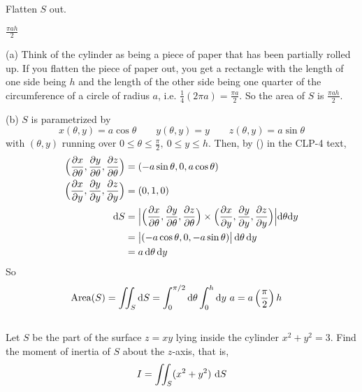 \begin{hint} 
Flatten $S$ out.
\end{hint}

\begin{answer} 
$\frac{\pi ah}{2}$
\end{answer}

\begin{solution}
(a) 
Think of the cylinder as being a piece of paper that has been partially rolled 
up. If you flatten the piece of paper out, you get a rectangle
with the length of one side being $h$ and the length of the other side
being one quarter of the circumference of a circle of radius $a$,
i.e. $\frac{1}{4}(2\pi a)=\frac{\pi a}{2}$. So the area of $S$ is
$\frac{\pi a h}{2}$.

(b) $S$ is parametrized by
\begin{equation*}
x(\theta,y)=a\cos\theta\qquad
y(\theta,y)=y\qquad
z(\theta,y)=a\sin\theta
\end{equation*}
with $(\theta,y)$ running over 
$0\le \theta\le \frac{\pi}{2},\ 0\le y\le h$. Then,
by () in the CLP-4 text,
\begin{align*}
\Big(\pdiff{x}{\theta},\pdiff{y}{\theta},\pdiff{z}{\theta}\Big)
&=(-a\sin\theta,0,a\cos\theta)\\
\Big(\pdiff{x}{y},\pdiff{y}{y},\pdiff{z}{y}\Big)
&=(0,1,0)\\
\dee{S}
&=
 \Big|\Big(\pdiff{x}{\theta},\pdiff{y}{\theta},\pdiff{z}{\theta}\Big)
\times\Big(\pdiff{x}{y},\pdiff{y}{y},\pdiff{z}{y}\Big)\Big|
     \dee{\theta} \dee{y}\\
&=\big|(-a\cos\theta,0,-a\sin\theta)\big|\,\dee{\theta}\,\dee{y}\\
&=a\,\dee{\theta}\,\dee{y}
\end{align*}
So
\begin{align*}
\text{Area}(S)&=\iint_S\mathrm{d}S
=\int_0^{\pi/2}\mathrm{d}\theta\int_0^h\mathrm{d}y\ a 
=a\left(\frac{\pi}{2}\right)h
\end{align*}

\end{solution}


\subsection*{\Procedural}

\begin{question}
Let $S$ be the part of the surface $z = xy$ lying inside the cylinder 
$x^2 + y^2 = 3$.  Find the moment of inertia of $S$ about the 
$z$-axis, that is,  
\begin{equation*}
      I =  \dblInt_S (x^2 + y^2)\ \dee{S} 
\end{equation*}
\end{question}

